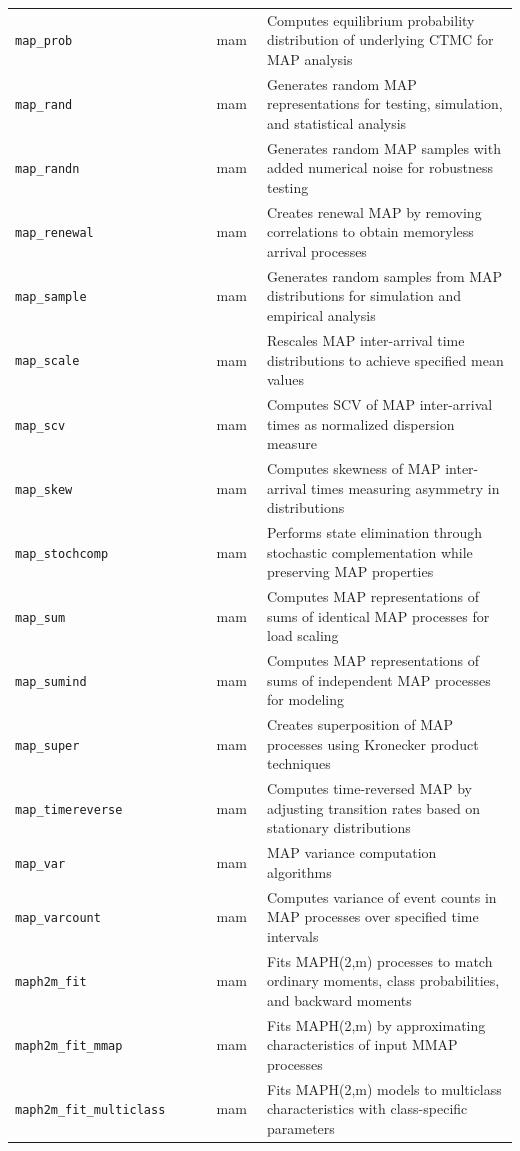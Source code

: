 \begin{footnotesize}
\begin{longtable}{|p{0.4\linewidth}|p{0.1\linewidth}|p{0.5\linewidth}|}
\texttt{map\_prob} & mam & Computes equilibrium probability distribution of underlying CTMC for MAP analysis\\
\texttt{map\_rand} & mam & Generates random MAP representations for testing, simulation, and statistical analysis\\
\texttt{map\_randn} & mam & Generates random MAP samples with added numerical noise for robustness testing\\
\texttt{map\_renewal} & mam & Creates renewal MAP by removing correlations to obtain memoryless arrival processes\\
\texttt{map\_sample} & mam & Generates random samples from MAP distributions for simulation and empirical analysis\\
\texttt{map\_scale} & mam & Rescales MAP inter-arrival time distributions to achieve specified mean values\\
\texttt{map\_scv} & mam & Computes SCV of MAP inter-arrival times as normalized dispersion measure\\
\texttt{map\_skew} & mam & Computes skewness of MAP inter-arrival times measuring asymmetry in distributions\\
\texttt{map\_stochcomp} & mam & Performs state elimination through stochastic complementation while preserving MAP properties\\
\texttt{map\_sum} & mam & Computes MAP representations of sums of identical MAP processes for load scaling\\
\texttt{map\_sumind} & mam & Computes MAP representations of sums of independent MAP processes for modeling\\
\texttt{map\_super} & mam & Creates superposition of MAP processes using Kronecker product techniques\\
\texttt{map\_timereverse} & mam & Computes time-reversed MAP by adjusting transition rates based on stationary distributions\\
\texttt{map\_var} & mam & MAP variance computation algorithms\\
\texttt{map\_varcount} & mam & Computes variance of event counts in MAP processes over specified time intervals\\
\texttt{maph2m\_fit} & mam & Fits MAPH(2,m) processes to match ordinary moments, class probabilities, and backward moments\\
\texttt{maph2m\_fit\_mmap} & mam & Fits MAPH(2,m) by approximating characteristics of input MMAP processes\\
\texttt{maph2m\_fit\_multiclass} & mam & Fits MAPH(2,m) models to multiclass characteristics with class-specific parameters\\

\end{longtable}
\end{footnotesize}
